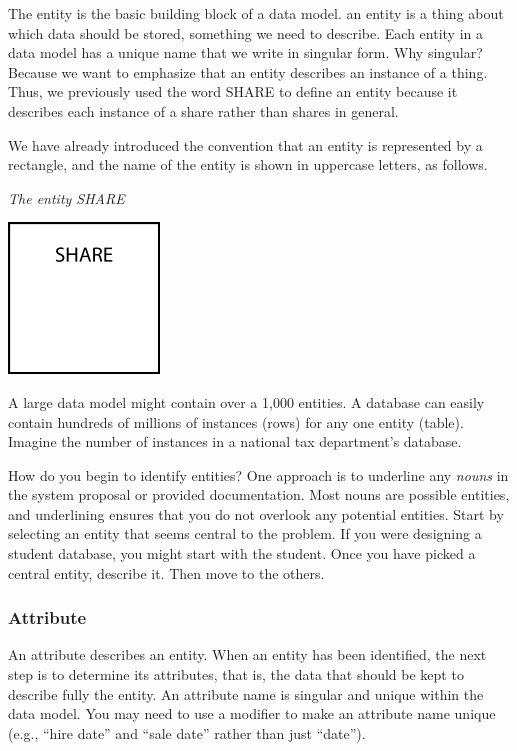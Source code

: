 \documentclass[
]{article}
\begin{document}
The entity is the basic building block of a data model. an entity is a
thing about which data should be stored, something we need to describe.
Each entity in a data model has a unique name that we write in singular
form. Why singular? Because we want to emphasize that an entity
describes an instance of a thing. Thus, we previously used the word
SHARE to define an entity because it describes each instance of a share
rather than shares in general.

We have already introduced the convention that an entity is represented
by a rectangle, and the name of the entity is shown in uppercase
letters, as follows.

\emph{The entity SHARE}

\includegraphics[width=1.58333in,height=\textheight]{Figures/Chapter 3/share.png}

A large data model might contain over a 1,000 entities. A database can
easily contain hundreds of millions of instances (rows) for any one
entity (table). Imagine the number of instances in a national tax
department's database.

How do you begin to identify entities? One approach is to underline any
\emph{nouns} in the system proposal or provided documentation. Most nouns are
possible entities, and underlining ensures that you do not overlook any
potential entities. Start by selecting an entity that seems central to
the problem. If you were designing a student database, you might start
with the student. Once you have picked a central entity, describe it.
Then move to the others.

\hypertarget{attribute}{%
\subsubsection*{Attribute}\label{attribute}}

An attribute describes an entity. When an entity has been identified,
the next step is to determine its attributes, that is, the data that
should be kept to describe fully the entity. An attribute name is
singular and unique within the data model. You may need to use a
modifier to make an attribute name unique (e.g., ``hire date'' and ``sale
date'' rather than just ``date'').
\end{document}
